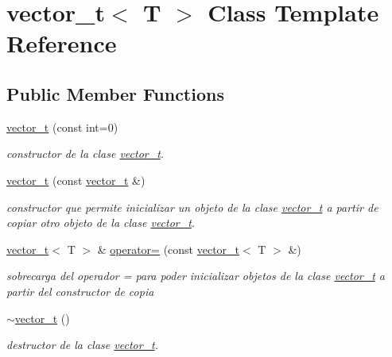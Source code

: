 \hypertarget{classvector__t}{}\section{vector\+\_\+t$<$ T $>$ Class Template Reference}
\label{classvector__t}
\subsection*{Public Member Functions}
\begin{DoxyCompactItemize}
\item 
\hyperlink{classvector__t_a1b574675f370c6e8ca1ffa1e6c760e82}{vector\+\_\+t} (const int=0)
\begin{DoxyCompactList}\small\item\em constructor de la clase \hyperlink{classvector__t}{vector\+\_\+t}. \end{DoxyCompactList}\item 
\hyperlink{classvector__t_a1f513bf5bf1305e5847e723d7c5d84a4}{vector\+\_\+t} (const \hyperlink{classvector__t}{vector\+\_\+t} \&)
\begin{DoxyCompactList}\small\item\em constructor que permite inicializar un objeto de la clase \hyperlink{classvector__t}{vector\+\_\+t} a partir de copiar otro objeto de la clase \hyperlink{classvector__t}{vector\+\_\+t}. \end{DoxyCompactList}\item 
\hyperlink{classvector__t}{vector\+\_\+t}$<$ T $>$ \& \hyperlink{classvector__t_a44ee95cba66ece73a42fae2d8e2ac884}{operator=} (const \hyperlink{classvector__t}{vector\+\_\+t}$<$ T $>$ \&)
\begin{DoxyCompactList}\small\item\em sobrecarga del operador = para poder inicializar objetos de la clase \hyperlink{classvector__t}{vector\+\_\+t} a partir del constructor de copia \end{DoxyCompactList}\item 
\mbox{\label{classvector__t_aea862b224c217c1080ea72d8d6ffed5a}} 
\hyperlink{classvector__t_aea862b224c217c1080ea72d8d6ffed5a}{$\sim$vector\+\_\+t} ()
\begin{DoxyCompactList}\small\item\em destructor de la clase \hyperlink{classvector__t}{vector\+\_\+t}. \end{DoxyCompactList}\item 

\end{DoxyCompactItemize}
